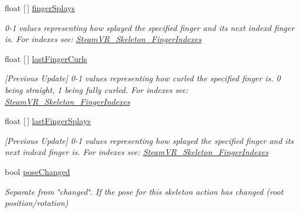 \begin{DoxyCompactItemize}
float \mbox{[}$\,$\mbox{]} \mbox{\hyperlink{class_valve_1_1_v_r_1_1_steam_v_r___action___skeleton___source_ae03d33e99edbf36ecd3fc8327d85b4e0}{finger\+Splays}}
\begin{DoxyCompactList}\small\item\em 0-\/1 values representing how splayed the specified finger and it\textquotesingle{}s next index\textquotesingle{}d finger is. For indexes see\+: \mbox{\hyperlink{class_valve_1_1_v_r_1_1_steam_v_r___skeleton___finger_indexes}{Steam\+V\+R\+\_\+\+Skeleton\+\_\+\+Finger\+Indexes}} \end{DoxyCompactList}\item 
float \mbox{[}$\,$\mbox{]} \mbox{\hyperlink{class_valve_1_1_v_r_1_1_steam_v_r___action___skeleton___source_ae2e59cdb259c54bc3f5b733917d35a26}{last\+Finger\+Curls}}
\begin{DoxyCompactList}\small\item\em \mbox{[}Previous Update\mbox{]} 0-\/1 values representing how curled the specified finger is. 0 being straight, 1 being fully curled. For indexes see\+: \mbox{\hyperlink{class_valve_1_1_v_r_1_1_steam_v_r___skeleton___finger_indexes}{Steam\+V\+R\+\_\+\+Skeleton\+\_\+\+Finger\+Indexes}} \end{DoxyCompactList}\item 
float \mbox{[}$\,$\mbox{]} \mbox{\hyperlink{class_valve_1_1_v_r_1_1_steam_v_r___action___skeleton___source_a4a29b57e497cb86893a7529abe4d6a83}{last\+Finger\+Splays}}
\begin{DoxyCompactList}\small\item\em \mbox{[}Previous Update\mbox{]} 0-\/1 values representing how splayed the specified finger and it\textquotesingle{}s next index\textquotesingle{}d finger is. For indexes see\+: \mbox{\hyperlink{class_valve_1_1_v_r_1_1_steam_v_r___skeleton___finger_indexes}{Steam\+V\+R\+\_\+\+Skeleton\+\_\+\+Finger\+Indexes}} \end{DoxyCompactList}\item 
bool \mbox{\hyperlink{class_valve_1_1_v_r_1_1_steam_v_r___action___skeleton___source_a9f1a7a40aa6b4964e5153b263b4b8f35}{pose\+Changed}}
\begin{DoxyCompactList}\small\item\em Separate from \char`\"{}changed\char`\"{}. If the pose for this skeleton action has changed (root position/rotation) \end{DoxyCompactList}\item 

\end{DoxyCompactItemize}
